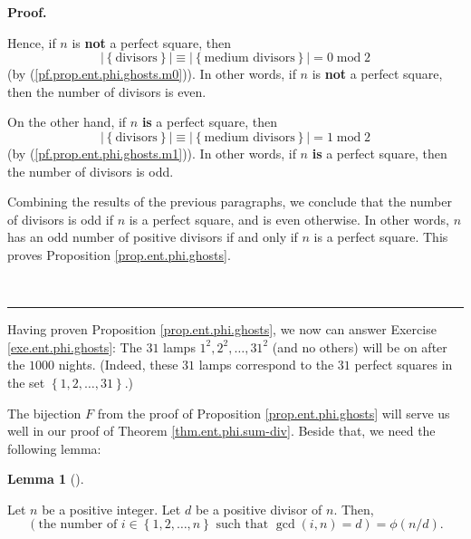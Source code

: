 \documentclass[numbers=enddot,12pt,final,onecolumn,notitlepage]{scrartcl}%
\numberwithin{exer}{subsection}
\theoremstyle{definition}
\newtheorem{lem}[theo]{Lemma}
\newenvironment{lemma}[1][]
{\begin{lem}[#1]\begin{leftbar}}
{\end{leftbar}\end{lem}}
\newenvironment{fineprint}{\begin{small}}{\end{small}}
\newenvironment{proof}[1][Proof]{\noindent\textbf{#1.} }{\ \rule{0.5em}{0.5em}}
\begin{document}
\begin{proof}
\begin{fineprint}
Hence, if $n$ is \textbf{not} a perfect square, then%
\[
\left\vert \left\{  \text{divisors}\right\}  \right\vert \equiv\left\vert
\left\{  \text{medium divisors}\right\}  \right\vert =0\operatorname{mod}2
\]
(by (\ref{pf.prop.ent.phi.ghosts.m0})). In other words, if $n$ is \textbf{not}
a perfect square, then the number of divisors is even.

On the other hand, if $n$ \textbf{is} a perfect square, then%
\[
\left\vert \left\{  \text{divisors}\right\}  \right\vert \equiv\left\vert
\left\{  \text{medium divisors}\right\}  \right\vert =1\operatorname{mod}2
\]
(by (\ref{pf.prop.ent.phi.ghosts.m1})). In other words, if $n$ \textbf{is} a
perfect square, then the number of divisors is odd.

Combining the results of the previous paragraphs, we conclude that the number
of divisors is odd if $n$ is a perfect square, and is even otherwise. In other
words, $n$ has an odd number of positive divisors if and only if $n$ is a
perfect square. This proves Proposition \ref{prop.ent.phi.ghosts}.
\end{fineprint}
\end{proof}

Having proven Proposition \ref{prop.ent.phi.ghosts}, we now can answer
Exercise \ref{exe.ent.phi.ghosts}: The $31$ lamps $1^{2},2^{2},\ldots,31^{2}$
(and no others) will be on after the $1000$ nights. (Indeed, these $31$ lamps
correspond to the $31$ perfect squares in the set $\left\{  1,2,\ldots
,31\right\}  $.)

The bijection $F$ from the proof of Proposition \ref{prop.ent.phi.ghosts} will
serve us well in our proof of Theorem \ref{thm.ent.phi.sum-div}. Beside that,
we need the following lemma:

\begin{lemma}
\label{lem.ent.phi.sum-div.n/d}Let $n$ be a positive integer. Let $d$ be a
positive divisor of $n$. Then,%
\[
\left(  \text{the number of }i\in\left\{  1,2,\ldots,n\right\}  \text{ such
that }\gcd\left(  i,n\right)  =d\right)  =\phi\left(  n/d\right)  .
\]

\end{lemma}
\end{document}
